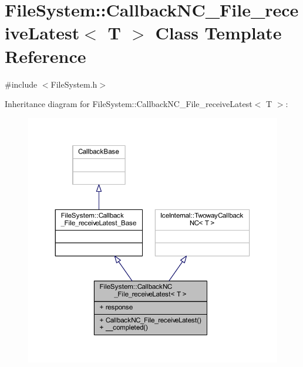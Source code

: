 \hypertarget{class_file_system_1_1_callback_n_c___file__receive_latest}{}\section{File\+System\+:\+:Callback\+N\+C\+\_\+\+File\+\_\+receive\+Latest$<$ T $>$ Class Template Reference}
\label{class_file_system_1_1_callback_n_c___file__receive_latest}


{\ttfamily \#include $<$File\+System.\+h$>$}



Inheritance diagram for File\+System\+:\+:Callback\+N\+C\+\_\+\+File\+\_\+receive\+Latest$<$ T $>$\+:
\nopagebreak
\begin{figure}[H]
\begin{center}
\leavevmode
\includegraphics[width=350pt]{class_file_system_1_1_callback_n_c___file__receive_latest__inherit__graph}
\end{center}
\end{figure}


